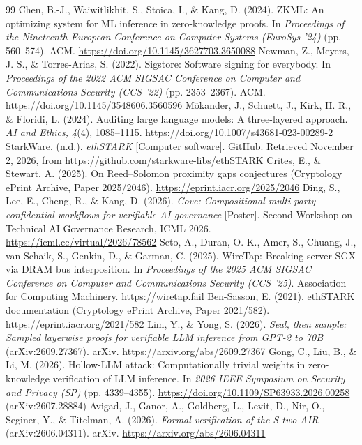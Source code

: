 \documentclass[11pt]{article}
\begin{document}
\begin{thebibliography}{99}
 Chen, B.-J., Waiwitlikhit, S., Stoica, I., \& Kang, D. (2024). ZKML: An optimizing system for ML inference in zero-knowledge proofs. In \emph{Proceedings of the Nineteenth European Conference on Computer Systems (EuroSys '24)} (pp. 560--574). ACM. \url{https://doi.org/10.1145/3627703.3650088}
 Newman, Z., Meyers, J. S., \& Torres-Arias, S. (2022). Sigstore: Software signing for everybody. In \emph{Proceedings of the 2022 ACM SIGSAC Conference on Computer and Communications Security (CCS '22)} (pp. 2353--2367). ACM. \url{https://doi.org/10.1145/3548606.3560596}
 M\"{o}kander, J., Schuett, J., Kirk, H. R., \& Floridi, L. (2024). Auditing large language models: A three-layered approach. \emph{AI and Ethics, 4}(4), 1085--1115. \url{https://doi.org/10.1007/s43681-023-00289-2}
 StarkWare. (n.d.). \emph{ethSTARK} [Computer software]. GitHub. Retrieved November 2, 2026, from \url{https://github.com/starkware-libs/ethSTARK}
 Crites, E., \& Stewart, A. (2025). On Reed--Solomon proximity gaps conjectures (Cryptology ePrint Archive, Paper 2025/2046). \url{https://eprint.iacr.org/2025/2046}
 Ding, S., Lee, E., Cheng, R., \& Kang, D. (2026). \emph{Cove: Compositional multi-party confidential workflows for verifiable AI governance} [Poster]. Second Workshop on Technical AI Governance Research, ICML 2026. \url{https://icml.cc/virtual/2026/78562}
 Seto, A., Duran, O. K., Amer, S., Chuang, J., van Schaik, S., Genkin, D., \& Garman, C. (2025). WireTap: Breaking server SGX via DRAM bus interposition. In \emph{Proceedings of the 2025 ACM SIGSAC Conference on Computer and Communications Security (CCS '25)}. Association for Computing Machinery. \url{https://wiretap.fail}
 Ben-Sasson, E. (2021). ethSTARK documentation (Cryptology ePrint Archive, Paper 2021/582). \url{https://eprint.iacr.org/2021/582}
 Lim, Y., \& Yong, S. (2026). \emph{Seal, then sample: Sampled layerwise proofs for verifiable LLM inference from GPT-2 to 70B} (arXiv:2609.27367). arXiv. \url{https://arxiv.org/abs/2609.27367}
 Gong, C., Liu, B., \& Li, M. (2026). Hollow-LLM attack: Computationally trivial weights in zero-knowledge verification of LLM inference. In \emph{2026 IEEE Symposium on Security and Privacy (SP)} (pp. 4339--4355). \url{https://doi.org/10.1109/SP63933.2026.00258} (arXiv:2607.28884)
 Avigad, J., Ganor, A., Goldberg, L., Levit, D., Nir, O., Seginer, Y., \& Titelman, A. (2026). \emph{Formal verification of the S-two AIR} (arXiv:2606.04311). arXiv. \url{https://arxiv.org/abs/2606.04311}

\end{thebibliography}
\end{document}
